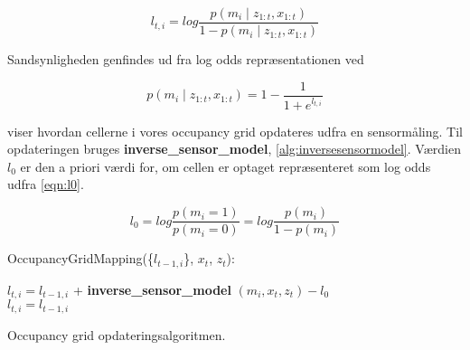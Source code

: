 \begin{equation}
l_{t,i} = log{ \frac{p(m_i \mid z_{1:t}, x_{1:t})}{1 - p(m_i \mid z_{1:t}, x_{1:t})}} 
\end{equation} 

Sandsynligheden genfindes ud fra log odds repræsentationen ved

\begin{equation}
	p(m_i \mid z_{1:t}, x_{1:t}) = 1 - \frac{1}{1 + e^{l_{t,i}}}
\end{equation} 

 viser hvordan cellerne i vores occupancy grid opdateres udfra en sensormåling. 
Til opdateringen bruges \textbf{inverse\_sensor\_model}, \cref{alg:inversesensormodel}.
Værdien $ l_0 $ er den a priori værdi for, om cellen er optaget repræsenteret som log odds udfra \cref{eqn:l0}.

\begin{equation}
  l_0 =  log \frac{p(m_i = 1)}{p(m_i = 0)} = log \frac{p(m_i)}{1- p(m_i)}
\end{equation} 

\begin{algorithm}[H]
\LinesNumbered
OccupancyGridMapping(\{$l_{t-1,i}$\}, $x_t$, $z_t$):

{
{ $ l_{t,i} = l_{t-1,i} $ + \textbf{inverse\_sensor\_model} $( m_i, x_t, z_t ) - l_0$\\ }
{ $ l_{t,i} = l_{t-1,i}  $\\ }
}
\caption{Occupancy grid opdateringsalgoritmen.}\label{occupancygrid:alg}
\end{algorithm}





